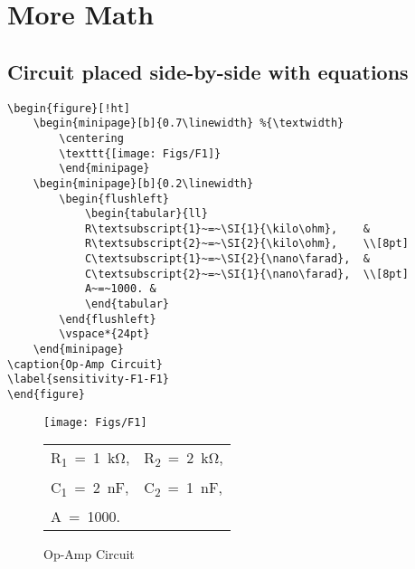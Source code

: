 \section{More Math}
%
%
\subsection{Circuit placed side-by-side with equations}
%
\begin{verbatim}
\begin{figure}[!ht]
	\begin{minipage}[b]{0.7\linewidth} %{\textwidth}
		\centering
		\texttt{[image: Figs/F1]}  
		\end{minipage}
	\begin{minipage}[b]{0.2\linewidth}
		\begin{flushleft}
			\begin{tabular}{ll}
			R\textsubscript{1}~=~\SI{1}{\kilo\ohm},    & 
			R\textsubscript{2}~=~\SI{2}{\kilo\ohm},    \\[8pt]
			C\textsubscript{1}~=~\SI{2}{\nano\farad},  & 
			C\textsubscript{2}~=~\SI{1}{\nano\farad},  \\[8pt]
			A~=~1000. &	
			\end{tabular}
		\end{flushleft}
		\vspace*{24pt}
	\end{minipage}
\caption{Op-Amp Circuit}
\label{sensitivity-F1-F1}
\end{figure}
\end{verbatim}
%
%
\begin{figure}[!ht]
	\begin{minipage}[b]{0.7\linewidth}
		\centering
		\texttt{[image: Figs/F1]} 
	\end{minipage}
	\begin{minipage}[b]{0.2\linewidth}
		\begin{flushleft}
			\begin{tabular}{ll}
				R\textsubscript{1}~=~\SI{1}{\kilo\ohm},    & 
				R\textsubscript{2}~=~\SI{2}{\kilo\ohm},    \\[8pt]
				C\textsubscript{1}~=~\SI{2}{\nano\farad},  & C\textsubscript{2}~=~\SI{1}{\nano\farad},  \\[8pt]
				A~=~1000. &	
			\end{tabular}
		\end{flushleft}
		\vspace*{24pt}
	\end{minipage}
	\caption{Op-Amp Circuit}
	\label{sensitivity-F1-F1}
\end{figure}
%
%
%
\newpage

